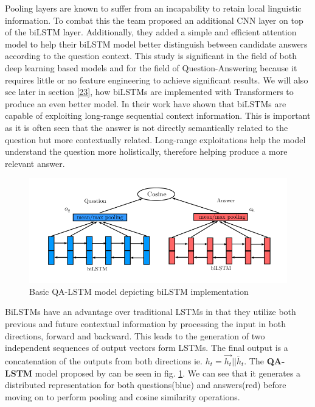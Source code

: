 \documentclass[a4paper,12pt]{report}
\begin{document}
            Pooling layers are known to suffer from an incapability to retain local linguistic information. To combat this the team proposed an additional CNN layer on top of the biLSTM layer. Additionally, they added a simple and efficient attention model to help their biLSTM model better distinguish between candidate answers according to the question context. This study is significant in the field of both deep learning based models and for the field of Question-Answering because it requires little or no feature engineering to achieve significant results. We will also see later in section \ref{23}, how biLSTMs are implemented with Transformers to produce an even better model.
            In their work \citep{lstmhaighextractive} have shown that biLSTMs are capable of exploiting long-range sequential context information. This is important as it is often seen that the answer is not directly semantically related to the question but more contextually related. Long-range exploitations help the model understand the question more holistically, therefore helping produce a more relevant answer.
	        \begin{figure}
                \centering
                \includegraphics[scale=0.4]{../images/lstm-bilstmhaig.png}
                \caption{Basic QA-LSTM model depicting biLSTM implementation \cite{lstmhaighextractive}}\label{lstmhaig}
            \end{figure}
             BiLSTMs have an advantage over traditional LSTMs in that they utilize both previous and future contextual information by processing the input in both directions, forward and backward. This leads to the generation of two independent sequences of output vectors form LSTMs. The final output is a concatenation  of the outputs from both directions ie. $h_t= \overrightarrow{h_t} || \overleftarrow{h_t} $.
             The \textbf{QA-LSTM} model  proposed by \citep{lstmhaighextractive} can be seen in fig. \ref{lstmhaig}. We can see that it generates a distributed representation for both questions(blue) and answers(red) before moving on to perform pooling and cosine similarity operations.
\end{document}

